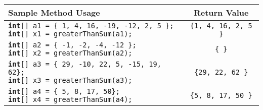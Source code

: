 \documentclass[12pt]{article}
\begin{document}
\begin{center}
\small
\begin{tabular}{| l | c |}
	\hline\rule{0pt}{4ex}
	Sample Method Usage & Return Value\\
	\hline\rule{0pt}{5ex}
	\makecell[l]{\texttt{\textbf{int}[] a1 = \{ 1, 4, 16, -19, -12, 2, 5 \}; } \\ \texttt{\textbf{int}[] x1 = greaterThanSum(a1);}} & \texttt{\{1, 4, 16, 2, 5  \}} \\
	\hline\rule{0pt}{5ex}
	\makecell[l]{\texttt{\textbf{int}[] a2 = \{ -1, -2, -4, -12 \}; } \\ \texttt{\textbf{int}[] x2 = greaterThanSum(a2);}} & \texttt{\{ \}} \\
	\hline\rule{0pt}{5ex}
	\makecell[l]{\texttt{\textbf{int}[] a3 = \{  29, -10, 22, 5, -15, 19, 62\}; } \\ \texttt{\textbf{int}[] x3 = greaterThanSum(a3);}} & \texttt{\{29, 22, 62  \}} \\
	\hline\rule{0pt}{5ex}
	\makecell[l]{\texttt{\textbf{int}[] a4 = \{ 5, 8, 17, 50\}; } \\ \texttt{\textbf{int}[] x4 = greaterThanSum(a4);}} & \texttt{\{5, 8, 17, 50 \}} \\
	\hline
		\end{tabular}
	\end{center}
	
\end{document}
